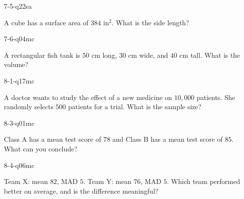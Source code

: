 \begin{practiceQuestion}{7-5-q22}{sa}
\begin{questionText}
A cube has a surface area of $384$ in$^2$. What is the side length?
\end{questionText}
\end{practiceQuestion}

\begin{practiceQuestion}{7-6-q04}{mc}
\begin{questionText}
A rectangular fish tank is $50$ cm long, $30$ cm wide, and $40$ cm tall. What is the volume?
\end{questionText}
\end{practiceQuestion}

\begin{practiceQuestion}{8-1-q17}{mc}
\begin{questionText}
A doctor wants to study the effect of a new medicine on $10{,}000$ patients. She randomly selects $500$ patients for a trial. What is the sample size?
\end{questionText}
\end{practiceQuestion}

\begin{practiceQuestion}{8-3-q01}{mc}
\begin{questionText}
Class A has a mean test score of $78$ and Class B has a mean test score of $85$. What can you conclude?
\end{questionText}
\end{practiceQuestion}

\begin{practiceQuestion}{8-4-q06}{mc}
\begin{questionText}
Team X: mean $82$, MAD $5$. Team Y: mean $76$, MAD $5$. Which team performed better on average, and is the difference meaningful?
\end{questionText}
\end{practiceQuestion}

